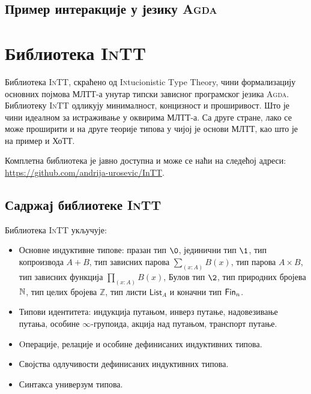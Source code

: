 \documentclass[12pt,oneside]{memoir}
\begin{document}
\section{Пример интеракције у језику \textsc{Agda}}
\label{sec:ex}



\chapter{Библиотека \textsc{InTT}}

Библиотека \textsc{InTT}, скраћено од \textsc{In}tucionistic \textsc{T}ype \textsc{T}heory, чини формализацију основних појмова МЛТТ-а унутар типски зависног програмског језика \textsc{Agda}. Библиотеку \textsc{InTT} одликују минималност, концизност и проширивост. Што је чини идеалном за истраживање у оквирима МЛТТ-а. Са друге стране, лако се може проширити и на друге теорије типова у чијој је основи МЛТТ, као што је на пример и ХоТТ. 

Комплетна библиотека је јавно доступна и може се наћи на следећој адреси: \url{https://github.com/andrija-urosevic/InTT}.

\section{Садржај библиотеке \textsc{InTT}}

Библиотека \textsc{InTT} укључује:
\begin{itemize}
    \item{Основне индуктивне типове: празан тип $\0$, јединични тип $\1$, тип копроизвода $A + B$, тип зависних парова $\sum_{(x : A)} B(x)$, тип парова $A \times B$, тип зависних функција $\prod_{(x : A)} B(x)$, Булов тип $\2$, тип природних бројева ${\mathbb{N}}$, тип целих бројева $\mathbb{Z}$, тип листи $\mathsf{List}_{A}$ и коначни тип $\mathsf{Fin}_{n}$.}
    \item{Типови идентитета: индукција путањом, инверз путање, надовезивање путања, особине $\infty$-групоида, акција над путањом, транспорт путање.}
    \item{Oперације, релације и особине дефинисаних индуктивних типова.}
    \item{Својства одлучивости дефинисаних индуктивних типова.}
    \item{Синтакса универзум типова.}
\end{itemize}
\end{document}
